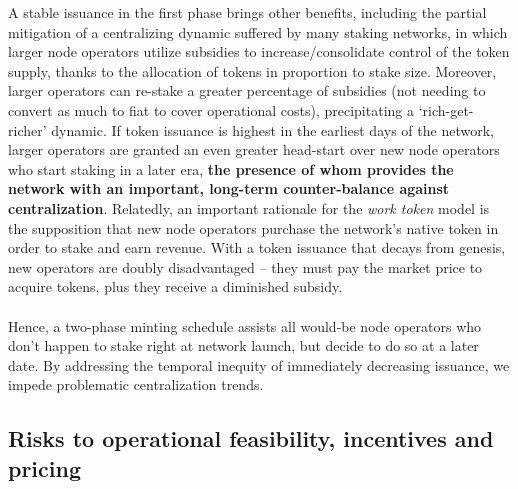 \documentclass[8pt]{article}
\begin{document}
A stable issuance in the first phase brings other benefits, including the partial mitigation of a centralizing dynamic suffered by many staking networks, in which larger node operators utilize subsidies to increase/consolidate control of the token supply, thanks to the allocation of tokens in proportion to stake size. Moreover, larger operators can re-stake a greater percentage of subsidies (not needing to convert as much to fiat to cover operational costs), precipitating a `rich-get-richer' dynamic. If token issuance is highest in the earliest days of the network, larger operators are granted an even greater head-start over new node operators who start staking in a later era, \textbf{the presence of whom provides the network with an important, long-term counter-balance against centralization}. Relatedly, an important rationale for the \textit{work token} model is the supposition that new node operators purchase the network's native token in order to stake and earn revenue. With a token issuance that decays from genesis, new operators are doubly disadvantaged – they must pay the market price to acquire tokens, plus they receive a diminished subsidy. 
\\\\
Hence, a two-phase minting schedule assists all would-be node operators who don't happen to stake right at network launch, but decide to do so at a later date. By addressing the temporal inequity of immediately decreasing issuance, we impede problematic centralization trends.

\subsection{Risks to operational feasibility, incentives and pricing}
\end{document}
